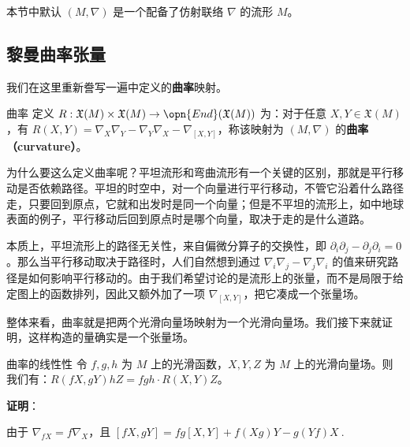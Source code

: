 

本节中默认 $(M, \nabla)$ 是一个配备了仿射联络 $\nabla$ 的流形 $M$。

\subsection{黎曼曲率张量}

我们在这里重新誊写一遍中定义的\textbf{曲率}映射。

\begin{definition}{曲率}
定义 $R:\mathfrak{X}(M)\times\mathfrak{X}(M)\to\opn{End}(\mathfrak{X}(M))$ 为：对于任意 $X, Y\in\mathfrak{X}(M)$，有 $R(X, Y)=\nabla_X\nabla_Y-\nabla_Y\nabla_X-\nabla_{[X, Y]}$，称该映射为 $(M, \nabla)$ 的\textbf{曲率（curvature）}。
\end{definition}

为什么要这么定义曲率呢？平坦流形和弯曲流形有一个关键的区别，那就是平行移动是否依赖路径。平坦的时空中，对一个向量进行平行移动，不管它沿着什么路径走，只要回到原点，它就和出发时是同一个向量；但是不平坦的流形上，如中地球表面的例子，平行移动后回到原点时是哪个向量，取决于走的是什么道路。

本质上，平坦流形上的路径无关性，来自偏微分算子的交换性，即 $\partial_i\partial_j-\partial_j\partial_i=0$。那么当平行移动取决于路径时，人们自然想到通过 $\nabla_i\nabla_j-\nabla_j\nabla_i$ 的值来研究路径是如何影响平行移动的。由于我们希望讨论的是流形上的张量，而不是局限于给定图上的函数排列，因此又额外加了一项 $\nabla_{[X, Y]}$，把它凑成一个张量场。

整体来看，曲率就是把两个光滑向量场映射为一个光滑向量场。我们接下来就证明，这样构造的量确实是一个张量场。

\begin{theorem}{曲率的线性性}\label{the_RicciC_1}
令 $f, g, h$ 为 $M$ 上的光滑函数，$X, Y, Z$ 为 $M$ 上的光滑向量场。则我们有：$R(fX, gY)hZ=fgh\cdot R(X, Y)Z$。
\end{theorem}

\textbf{证明}：

由于 $\nabla_{fX}=f\nabla_X$，且 $[fX, gY]=fg[X, Y]+f(Xg)Y-g(Yf)X~.$

